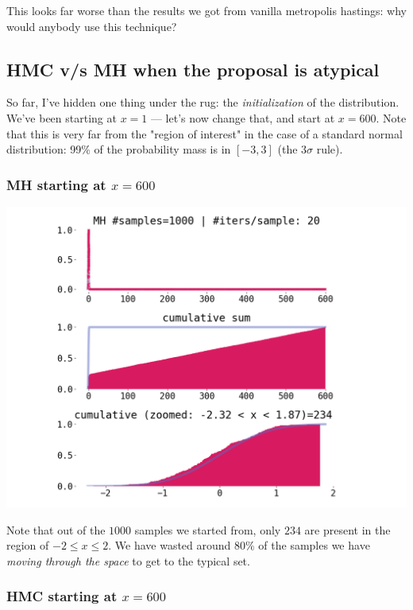 \documentclass[titlepage]{article}
\begin{document}
This looks far worse than the results we got from vanilla metropolis hastings:
why would anybody use this technique?


\subsection{HMC v/s MH when the proposal is atypical}

So far, I've hidden one thing under the rug: the \emph{initialization} of
the distribution. We've been starting at $x = 1$ --- let's now change that,
and start at $x = 600$. Note that this is very far from the "region of
interest" in the case of a standard normal distribution: 99\% of the probability
mass is in $[-3, 3]$ (the $3 \sigma$ rule).

\subsubsection{MH starting at $x = 600$}

\includegraphics[width=\textwidth]{mcmc-mh-uncorr-1d-exp-startx-600.png}

Note that out of the $1000$ samples we started from, only $234$ are present
in the region of $-2 \leq x \leq 2$. We have wasted around $80\%$ of the
samples we have \emph{moving through the space} to get to the typical set.


\subsubsection{HMC starting at $x = 600$}
\end{document}
